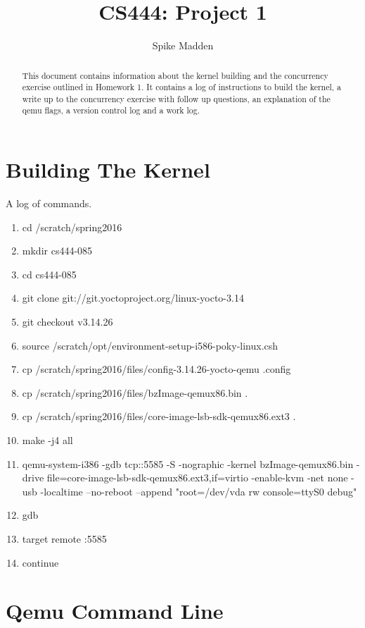 \documentclass[letterpaper,
10pt, titlepage, draftclsnofoot, onecolumn]{IEEEtran}
\title{CS444: Project 1}
\author{Spike Madden}
\begin{document}
\begin{titlingpage}
	\maketitle
	\begin{abstract}
		This document contains information about the kernel building and the concurrency exercise outlined in Homework 1.
    It contains a log of instructions to build the kernel, a write up to the concurrency exercise with follow up questions,
    an explanation of the qemu flags, a version control log and a work log.

	\end{abstract}
\end{titlingpage}

\section*{Building The Kernel}

A log of commands.

\begin{enumerate}
\item cd /scratch/spring2016
\item mkdir cs444-085
\item cd cs444-085
\item git clone git://git.yoctoproject.org/linux-yocto-3.14
\item git checkout v3.14.26
\item source /scratch/opt/environment-setup-i586-poky-linux.csh
\item cp /scratch/spring2016/files/config-3.14.26-yocto-qemu .config
\item cp /scratch/spring2016/files/bzImage-qemux86.bin .
\item cp /scratch/spring2016/files/core-image-lsb-sdk-qemux86.ext3 .
\item make -j4 all
\item qemu-system-i386 -gdb tcp::5585 -S -nographic -kernel bzImage-qemux86.bin -drive file=core-image-lsb-sdk-qemux86.ext3,if=virtio -enable-kvm -net none -usb -localtime --no-reboot --append "root=/dev/vda rw console=ttyS0 debug"
\item gdb
\item target remote :5585
\item continue
\end{enumerate}

\section*{Qemu Command Line}
\end{document}
